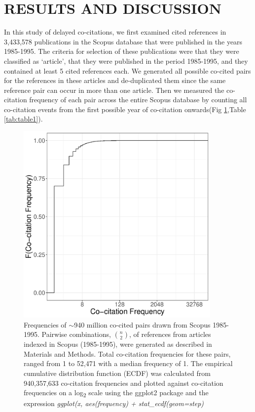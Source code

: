 \documentclass[utf8]{frontiersSCNS}
\begin{document}
\section{RESULTS AND DISCUSSION}

In this study of delayed co-citations, we first examined cited references in 3,433,578 publications in the Scopus database that were published in the years 1985-1995. The criteria for selection of these publications were that they were classified as `article', that they were published in the period 1985-1995, and they contained at least 5 cited references each. We generated all possible co-cited pairs for the references in these articles and de-duplicated them since the same reference pair can occur in more than one article. Then we measured the co-citation frequency of each pair across the entire Scopus database by counting all co-citation events from the first possible year of co-citation onwards(Fig \ref{fig:fig1},Table \ref{tab:table1}).

\begin{figure}[h!]
\begin{center}
\includegraphics[width=10cm]{fig1}%
\end{center}
\caption{Frequencies of $\sim$940 million co-cited pairs drawn from Scopus 1985-1995. Pairwise combinations, $n\choose 2$, of references from articles indexed in Scopus (1985-1995), were generated as described in Materials and Methods. Total co-citation frequencies for these pairs, ranged from 1 to 52,471 with a median frequency of 1. The empirical cumulative distribution function (ECDF) was calculated from 940,357,633 co-citation frequencies and plotted against co-citation frequencies on a log\textsubscript{2} scale using the ggplot2 package and the expression \emph{ggplot(x, aes(frequency) + stat\_ecdf(geom=\textquotesingle step\textquotesingle)}}
\label{fig:fig1}
\end{figure}
\end{document}
